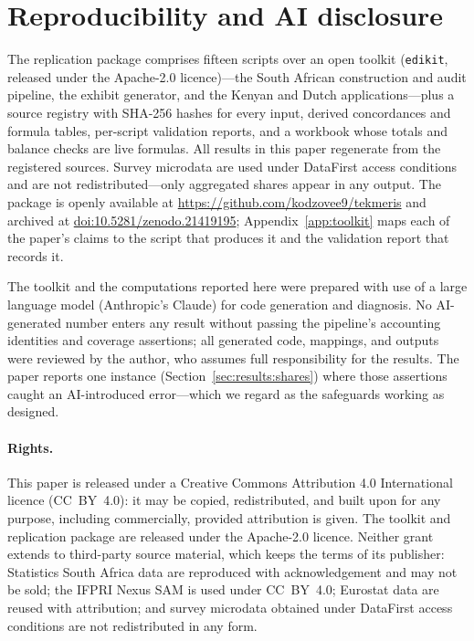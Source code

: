 \section*{Reproducibility and AI disclosure}\label{sec:disclosure}

The replication package comprises fifteen scripts over an open toolkit
(\texttt{edikit}, released under the Apache-2.0 licence)---the South
African construction and audit pipeline, the exhibit generator, and the
Kenyan and Dutch applications---plus a source registry with SHA-256 hashes
for every input, derived concordances and formula tables, per-script
validation reports, and a workbook whose totals and balance checks are
live formulas. All results in this paper regenerate from
the registered sources. Survey microdata are used under DataFirst access
conditions and are not redistributed---only aggregated shares appear in any
output. The package is openly available at
\url{https://github.com/kodzovee9/tekmeris} and archived at
\href{https://doi.org/10.5281/zenodo.21419195}{doi:10.5281/zenodo.21419195};
Appendix~\ref{app:toolkit} maps each of the paper's claims
to the script that produces it and the validation report that records
it.

The toolkit and the computations reported here were prepared with use of
a large language model (Anthropic's Claude) for code generation and
diagnosis. No AI-generated number
enters any result without passing the pipeline's accounting identities
and coverage assertions; all generated code, mappings, and outputs were
reviewed by the author, who assumes full responsibility for the results.
The paper reports one instance (Section~\ref{sec:results:shares}) where
those assertions caught an AI-introduced error---which we regard as the
safeguards working as designed.

\paragraph{Rights.} This paper is released under a Creative Commons
Attribution 4.0 International licence (CC~BY~4.0): it may be copied,
redistributed, and built upon for any purpose, including commercially,
provided attribution is given. The toolkit and replication package are
released under the Apache-2.0 licence. Neither grant extends to
third-party source material, which keeps the terms of its publisher:
Statistics South Africa data are reproduced with acknowledgement and may
not be sold; the IFPRI Nexus SAM is used under CC~BY~4.0; Eurostat data
are reused with attribution; and survey microdata obtained under
DataFirst access conditions are not redistributed in any form.
